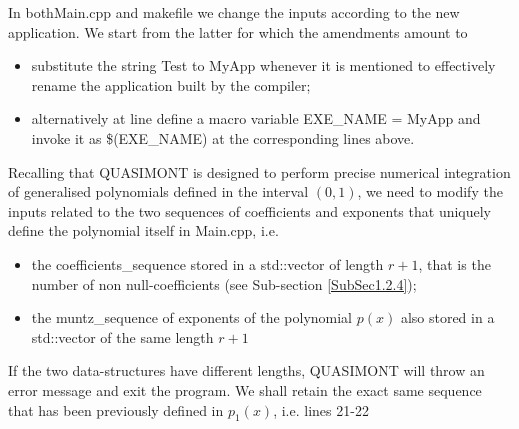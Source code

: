 \documentclass[a4paper, twosided]{book}
\begin{document}
\noindent
In both\colorbox{poliGrayBlue}{Main.cpp} and  \colorbox{poliGrayBlue}{makefile} we change the inputs according to the new application. We start from the latter for which the amendments amount to

\begin{itemize}
    \item substitute the string \colorbox{poliGrayBlue}{Test} to \colorbox{poliGrayBlue}{MyApp} whenever it is mentioned to effectively rename the application built by the compiler;
    \item alternatively at line define a macro variable \colorbox{poliGrayBlue}{EXE\_NAME = MyApp} and invoke it as \colorbox{poliGrayBlue}{\$(EXE\_NAME)} at the corresponding lines above.
\end{itemize}

\noindent
Recalling that QUASIMONT is designed to perform precise numerical integration of generalised polynomials defined in the interval $(0,1)$, we need to modify the inputs related to the two sequences of coefficients and exponents that uniquely define the polynomial itself in \colorbox{poliGrayBlue}{Main.cpp}, i.e.

\newpage
\begin{itemize}
    \item the \colorbox{poliGrayBlue}{coefficients\_sequence} stored in a \colorbox{poliGrayBlue}{std::vector} of length $r+1$, that is the number of non null-coefficients (see Sub-section \ref{SubSec1.2.4});
    \item the \colorbox{poliGrayBlue}{muntz\_sequence} of exponents of the polynomial $p(x)$ also stored in a \colorbox{poliGrayBlue}{std::vector} of the same length $r+1$
\end{itemize}

\noindent
If the two data-structures have different lengths, QUASIMONT will throw an error message and exit the program. We shall retain the exact same sequence that has been previously defined in $p_1(x)$, i.e. lines \colorbox{poliGrayBlue}{21-22}

\vspace{0.25cm}
\vspace{0.5cm}
\end{document}
